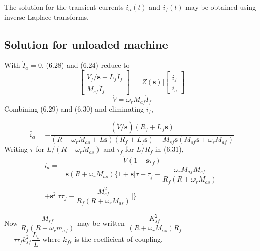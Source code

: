 \documentclass[a4paper,numbers=noenddot,12pt]{scrbook}
\begin{document}
The solution for the transient currents $i_a(t)$ and $i_f(t)$ may be obtained using inverse Laplace transforms.

\subsection{Solution for unloaded machine}
With $\mathring I_a =0$, (6.28) and (6.24) reduce to
\begin{equation}
    \begin{bmatrix}
        V_f/\textbf{s} + L_f \mathring I_f \\[2ex]
        M_{sf} \mathring I_f 
    \end{bmatrix}
    =
    \Bigg[ Z(\textbf{s})\Bigg]
    \begin{bmatrix}
        \bar i_f \\ \bar i_a %
    \end{bmatrix}
    \label{}
\end{equation}
\begin{equation}
    \mathring V = \omega_r M_{af} \mathring I_f
    \label{}
\end{equation}
Combining (6.29) and (6.30) and eliminating $i_f$,

\begin{equation}
    \bar i_a = - \dfrac{(\mathring V/\mathbf s)(R_f + L_f \mathbf s)}{(R + \omega_r M_{as}+L \mathbf s)(R_f + L_f \mathbf s) - M_{sf} \textbf{s} ( M_{sf} \textbf{s} + \omega_r M_{af})} %
    \label{}
\end{equation}
Writing $\tau$ for $L / (R + \omega_r M_{as})$ and $\tau_f$ for $L/R_f$ in (6.31),
\begin{multline}
    \bar i_a = - \dfrac{\mathring V(1-\textbf{s}\tau_f)}{\textbf{s}(R + \omega_r M_{as}) \bigg\{1 + \textbf{s} \bigg[\tau + \tau_f - \dfrac{\omega_r M_{af} M_{sf}}{R_f (R + \omega_r M_{as})} \bigg]} \\ %
    + \textbf{s}^2 \bigg[\tau \tau_f - \dfrac{M_{sf}^2}{R_f(R + \omega_r M_{as})}\bigg]\bigg\}
    \label{}
\end{multline}

\begingroup
\setlength{\lineskip}{2pt} 
\noindent Now $\dfrac{M_{sf}}{R_f(R + \omega_r m_{af})}$ may be written $\dfrac{K_{sf}^2}{(R + \omega_r M_{as}) R_f}$ \\
\phantom{Now }$= \tau \tau_f k_{sf}^2 \dfrac{L_s}{L}$ where $k_{fs}$ is the coefficient of coupling.\\
\end{document}
